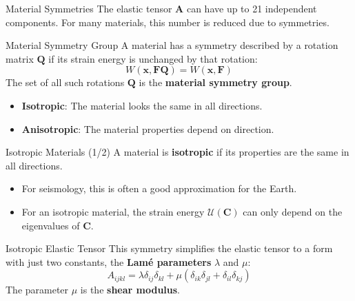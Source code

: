 \documentclass{beamer}
\begin{document}

\begin{frame}{Material Symmetries}
    The elastic tensor $\mathbf{A}$ can have up to 21 independent components. For many materials, this number is reduced due to symmetries.
    \pause
    \begin{block}{Material Symmetry Group}
        A material has a symmetry described by a rotation matrix $\mathbf{Q}$ if its strain energy is unchanged by that rotation:
        $$ W(\mathbf{x}, \mathbf{F}\mathbf{Q}) = W(\mathbf{x}, \mathbf{F}) $$
        The set of all such rotations $\mathbf{Q}$ is the \textbf{material symmetry group}.
    \end{block}
    \pause
    \begin{itemize}
        \item \textbf{Isotropic}: The material looks the same in all directions.
        \item \textbf{Anisotropic}: The material properties depend on direction.
    \end{itemize}
\end{frame}

\begin{frame}{Isotropic Materials (1/2)}
    A material is \textbf{isotropic} if its properties are the same in all directions.
    \pause
    \begin{itemize}
        \item For seismology, this is often a good approximation for the Earth.
        \item For an isotropic material, the strain energy $\mathcal{U}(\mathbf{C})$ can only depend on the eigenvalues of $\mathbf{C}$.
    \end{itemize}
    \pause
    \begin{block}{Isotropic Elastic Tensor}
        This symmetry simplifies the elastic tensor to a form with just two constants, the \textbf{Lamé parameters} $\lambda$ and $\mu$:
        $$ A_{ijkl} = \lambda\delta_{ij}\delta_{kl} + \mu(\delta_{ik}\delta_{jl} + \delta_{il}\delta_{kj}) $$
        The parameter $\mu$ is the \textbf{shear modulus}.
    \end{block}
\end{frame}
\end{document}

